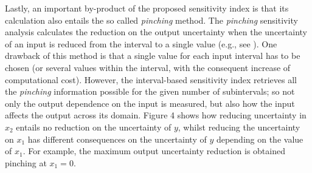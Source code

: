 \documentclass[twocolumn]{rps-esrel2022}
\begin{document}
Lastly, an important by-product of the proposed sensitivity index is that its calculation also entails the so called \textit{pinching} method.
The \textit{pinching} sensitivity analysis calculates the reduction on the output uncertainty when the uncertainty of an input is reduced from the interval to a single value (e.g., see \cite{ferson2006sensitivity, gray2022inference}).
One drawback of this method is that a single value for each input interval has to be chosen (or several values within the interval, with the consequent
increase of computational cost).
However, the interval-based sensitivity index retrieves all the \textit{pinching} information possible for the given number of subintervals; so not only the
output dependence on the input is measured, but also how the input affects the output across its domain.
Figure 4 shows how reducing uncertainty in $x_2$ entails no reduction on the uncertainty of $y$, whilst reducing the uncertainty on $x_1$ has different consequences on the
uncertainty of $y$ depending on the value of $x_1$.
For example, the maximum output uncertainty reduction is obtained pinching at $x_1 = 0$.
\end{document}
